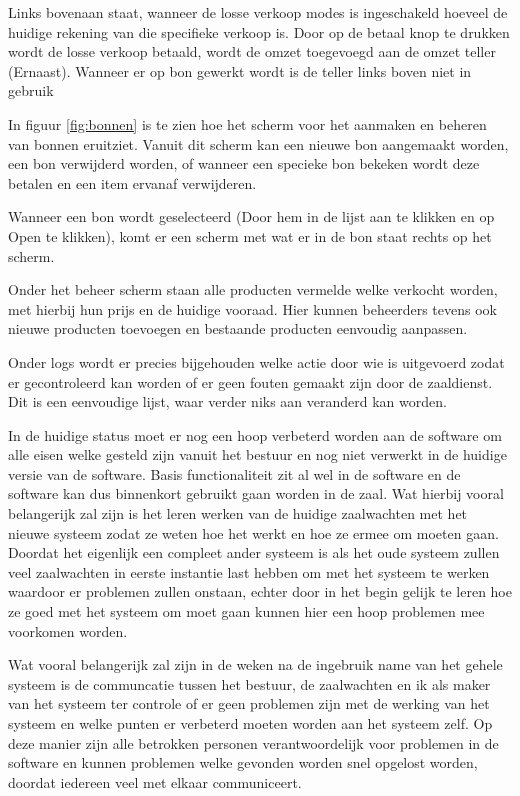 Links bovenaan staat, wanneer de losse verkoop modes is ingeschakeld hoeveel de huidige rekening van die specifieke verkoop is. Door op de betaal knop te drukken wordt de losse verkoop betaald, wordt de omzet toegevoegd aan de omzet teller (Ernaast). Wanneer er op bon gewerkt wordt is de teller links boven niet in gebruik

In figuur \ref{fig:bonnen} is te zien hoe het scherm voor het aanmaken en beheren van bonnen eruitziet. Vanuit dit scherm kan een nieuwe bon aangemaakt worden, een bon verwijderd worden, of wanneer een specieke bon bekeken wordt deze betalen en een item ervanaf verwijderen.

Wanneer een bon wordt geselecteerd (Door hem in de lijst aan te klikken en op Open te klikken), komt er een scherm met wat er in de bon staat rechts op het scherm.

Onder het beheer scherm staan alle producten vermelde welke verkocht worden, met hierbij hun prijs en de huidige vooraad. Hier kunnen beheerders tevens ook nieuwe producten toevoegen en bestaande producten eenvoudig aanpassen.

Onder logs wordt er precies bijgehouden welke actie door wie is uitgevoerd zodat er gecontroleerd kan worden of er geen fouten gemaakt zijn door de zaaldienst. Dit is een eenvoudige lijst, waar verder niks aan veranderd kan worden.


In de huidige status moet er nog een hoop verbeterd worden aan de software om  alle eisen welke gesteld zijn vanuit het bestuur en nog niet verwerkt in de huidige versie van de software. Basis functionaliteit zit al wel in de software en de software kan dus binnenkort gebruikt gaan worden in de zaal. Wat hierbij vooral belangerijk zal zijn is het leren werken van de huidige zaalwachten met het nieuwe systeem zodat ze weten hoe het werkt en hoe ze ermee om moeten gaan. Doordat het eigenlijk een compleet ander systeem is als het oude systeem zullen veel zaalwachten in eerste instantie last hebben om met het systeem te werken waardoor er problemen zullen onstaan, echter door in het begin gelijk te leren hoe ze goed met het systeem om moet gaan kunnen hier een hoop problemen mee voorkomen worden.

Wat vooral belangerijk zal zijn in de weken na de ingebruik name van het gehele systeem is de communcatie tussen het bestuur, de zaalwachten en ik als maker van het systeem ter controle of er geen problemen zijn met de werking van het systeem en welke punten er verbeterd moeten worden aan het systeem zelf. Op deze manier zijn alle betrokken personen verantwoordelijk voor problemen in de software en kunnen problemen welke gevonden worden snel opgelost worden, doordat iedereen veel met elkaar communiceert. 

